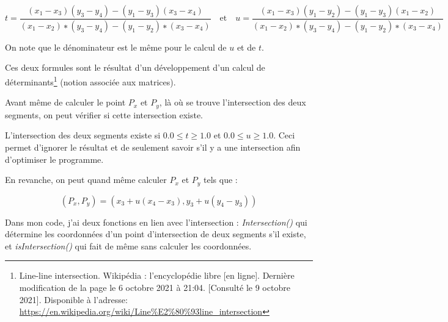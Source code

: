 \documentclass[11pt,french,a4paper,]{article}
\begin{document}
\[
t = \frac{(x_1 − x_3)(𝑦_3 − 𝑦_4) − (𝑦_1 − 𝑦_3) (x_3 − x_4)}
         {(x_1 − x_2) ∗ (y_3 − y_4) − (y_1 − y_2) ∗ (x_3 − x_4)}
    \mathrm{\quad et \quad}
u = \frac{(x_1 − x_3) (y_1 − y_2) − (y_1 − y_3) (x_1 − x_2)}
         {(x_1 − x_2) ∗ (y_3 − y_4) − (y_1 − y_2) ∗ (x_3 − x_4)}
\]

On note que le dénominateur est le même pour le calcul de \(u\) et de
\(t\).

Ces deux formules sont le résultat d'un développement d'un calcul de
déterminants\footnote{Line-line intersection. Wikipédia : l'encyclopédie
  libre {[}en ligne{]}. Dernière modification de la page le 6 octobre
  2021 à 21:04. {[}Consulté le 9 octobre 2021{]}. Disponible à
  l'adresse:
  \url{https://en.wikipedia.org/wiki/Line\%E2\%80\%93line_intersection}}
(notion associée aux matrices).

Avant même de calculer le point \(P_x\) et \(P_y\), là où se trouve
l'intersection des deux segments, on peut vérifier si cette intersection
existe.

L'intersection des deux segments existe si \(0.0 \leq t \geq 1.0\) et
\(0.0 \leq u \geq 1.0\). Ceci permet d'ignorer le résultat et de
seulement savoir s'il y a une intersection afin d'optimiser le
programme.

En revanche, on peut quand même calculer \(P_x\) et \(P_y\) tels que :

\[
(P_x, P_y) = (x_3 + u(x_4 - x_3), y_3 + u(y_4 - y_3))
\]

Dans mon code, j'ai deux fonctions en lien avec l'intersection :
\emph{Intersection()} qui détermine les coordonnées d'un point
d'intersection de deux segments s'il existe, et \emph{isIntersection()}
qui fait de même sans calculer les coordonnées.
\end{document}
